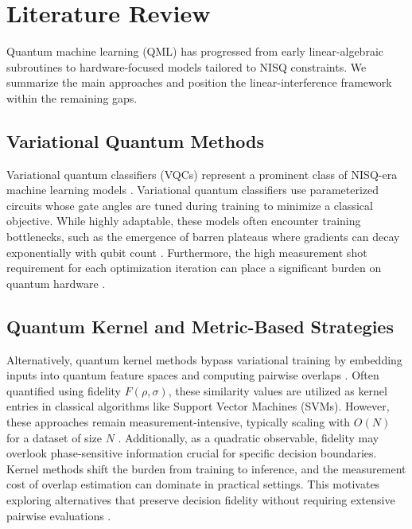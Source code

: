 \documentclass[conference]{IEEEtran}
\begin{document}
\section{Literature Review}

Quantum machine learning (QML) has progressed from early linear-algebraic subroutines to hardware-focused models tailored to NISQ constraints. We summarize the main approaches and position the linear-interference framework within the remaining gaps.

\subsection{Variational Quantum Methods}
Variational quantum classifiers (VQCs) represent a prominent class of NISQ-era machine learning models \cite{benedetti2019parameterized,abbas2021power}. Variational quantum classifiers use parameterized circuits whose gate angles are tuned during training to minimize a classical objective. While highly adaptable, these models often encounter training bottlenecks, such as the emergence of barren plateaus where gradients can decay exponentially with qubit count \cite{mcclean2018barren}. Furthermore, the high measurement shot requirement for each optimization iteration can place a significant burden on quantum hardware \cite{benedetti2019parameterized}.

\subsection{Quantum Kernel and Metric-Based Strategies}
Alternatively, quantum kernel methods bypass variational training by embedding inputs into quantum feature spaces and computing pairwise overlaps \cite{schuld2019feature,havlicek2019supervised}. Often quantified using fidelity $F(\rho, \sigma)$, these similarity values are utilized as kernel entries in classical algorithms like Support Vector Machines (SVMs). However, these approaches remain measurement-intensive, typically scaling with $O(N)$ for a dataset of size $N$ \cite{schuld2019feature,havlicek2019supervised}. Additionally, as a quadratic observable, fidelity may overlook phase-sensitive information crucial for specific decision boundaries.
Kernel methods shift the burden from training to inference, and the measurement cost of overlap estimation can dominate in practical settings. This motivates exploring alternatives that preserve decision fidelity without requiring extensive pairwise evaluations \cite{schuld2019feature,havlicek2019supervised}.
\end{document}

